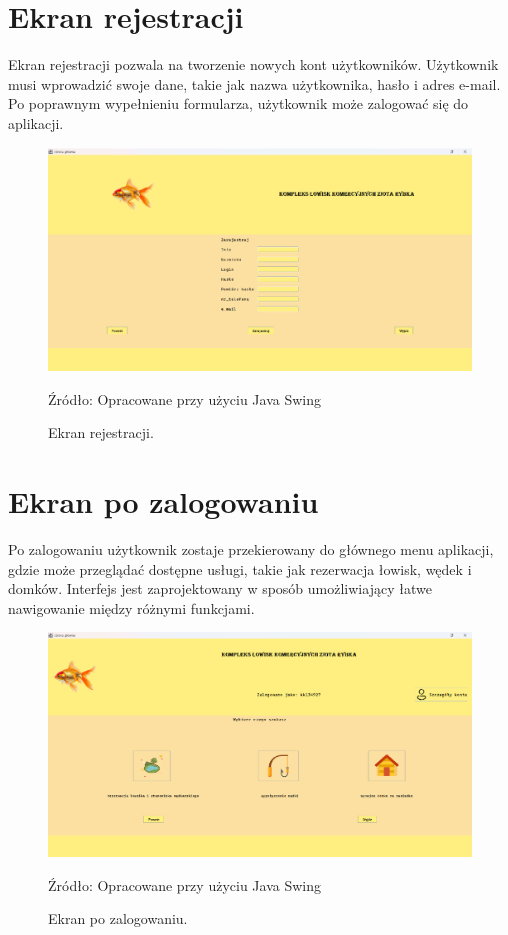 \section{Ekran rejestracji}
Ekran rejestracji pozwala na tworzenie nowych kont użytkowników. Użytkownik musi wprowadzić swoje dane, takie jak nazwa użytkownika, hasło i adres e-mail. Po poprawnym wypełnieniu formularza, użytkownik może zalogować się do aplikacji.
\begin{figure}[H]
    \centering
    \includegraphics[width=0.8\linewidth]{figures/register.eps}
    \caption{Ekran rejestracji.}
    \label{fig:register_screen}
    \small{Źródło: Opracowane przy użyciu Java Swing}
\end{figure}
\clearpage

\section{Ekran po zalogowaniu}
Po zalogowaniu użytkownik zostaje przekierowany do głównego menu aplikacji, gdzie może przeglądać dostępne usługi, takie jak rezerwacja łowisk, wędek i domków. Interfejs jest zaprojektowany w sposób umożliwiający łatwe nawigowanie między różnymi funkcjami.
\begin{figure}[H]
    \centering
    \includegraphics[width=0.8\linewidth]{figures/after.eps}
    \caption{Ekran po zalogowaniu.}
    \label{fig:after_login_screen}
    \small{Źródło: Opracowane przy użyciu Java Swing}\
\end{figure}
\clearpage

